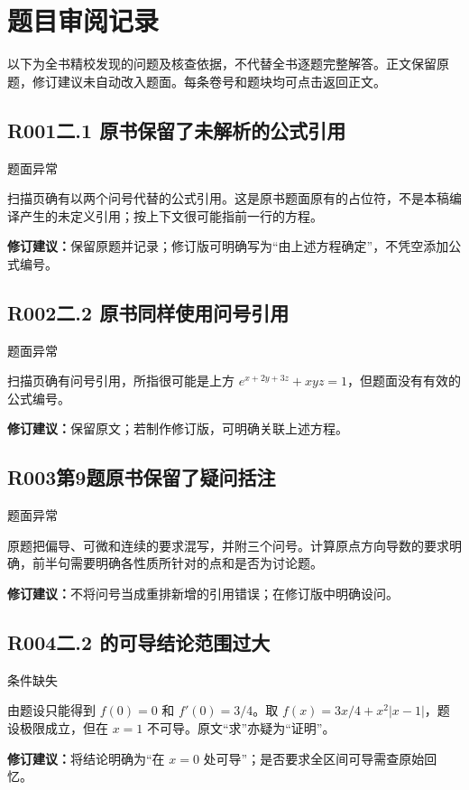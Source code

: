 \section*{题目审阅记录}
以下为全书精校发现的问题及核查依据，不代替全书逐题完整解答。正文保留原题，修订建议未自动改入题面。每条卷号和题块均可点击返回正文。
\subsection*{R001\quad 二.1 原书保留了未解析的公式引用}
\noindent{}\quad 题面异常\par
扫描页确有以两个问号代替的公式引用。这是原书题面原有的占位符，不是本稿编译产生的未定义引用；按上下文很可能指前一行的方程。
\par\textbf{修订建议：}保留原题并记录；修订版可明确写为“由上述方程确定”，不凭空添加公式编号。\par
{}
\subsection*{R002\quad 二.2 原书同样使用问号引用}
\noindent{}\quad 题面异常\par
扫描页确有问号引用，所指很可能是上方 $e^{x+2y+3z}+xyz=1$，但题面没有有效的公式编号。
\par\textbf{修订建议：}保留原文；若制作修订版，可明确关联上述方程。\par
{}
\subsection*{R003\quad 第9题原书保留了疑问括注}
\noindent{}\quad 题面异常\par
原题把偏导、可微和连续的要求混写，并附三个问号。计算原点方向导数的要求明确，前半句需要明确各性质所针对的点和是否为讨论题。
\par\textbf{修订建议：}不将问号当成重排新增的引用错误；在修订版中明确设问。\par
{}
\subsection*{R004\quad 二.2 的可导结论范围过大}
\noindent{}\quad 条件缺失\par
由题设只能得到 $f(0)=0$ 和 $f'(0)=3/4$。取 $f(x)=3x/4+x^2|x-1|$，题设极限成立，但在 $x=1$ 不可导。原文“求”亦疑为“证明”。
\par\textbf{修订建议：}将结论明确为“在 $x=0$ 处可导”；是否要求全区间可导需查原始回忆。\par
{}
